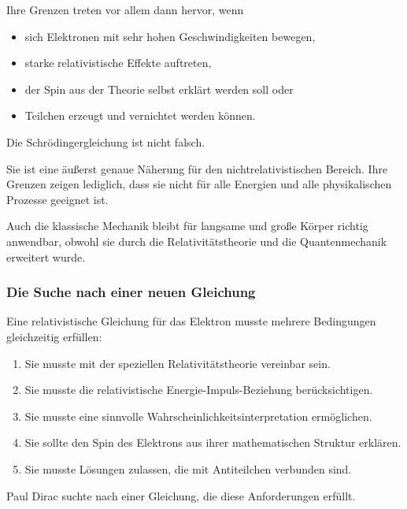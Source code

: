 Ihre Grenzen treten vor allem dann hervor, wenn

\begin{itemize}
	\item sich Elektronen mit sehr hohen Geschwindigkeiten bewegen,
	\item starke relativistische Effekte auftreten,
	\item der Spin aus der Theorie selbst erklärt werden soll oder
	\item Teilchen erzeugt und vernichtet werden können.
\end{itemize}

\begin{DidacticBox}
	\label{box:naeherung_keine_falsche_theorie}
	
	Die Schrödingergleichung ist nicht falsch.
	
	Sie ist eine äußerst genaue Näherung für den nichtrelativistischen
	Bereich. Ihre Grenzen zeigen lediglich, dass sie nicht für alle
	Energien und alle physikalischen Prozesse geeignet ist.
	
	Auch die klassische Mechanik bleibt für langsame und große Körper
	richtig anwendbar, obwohl sie durch die Relativitätstheorie und die
	Quantenmechanik erweitert wurde.
\end{DidacticBox}

\subsubsection*{Die Suche nach einer neuen Gleichung}

Eine relativistische Gleichung für das Elektron musste mehrere
Bedingungen gleichzeitig erfüllen:

\begin{enumerate}
	\item Sie musste mit der speziellen Relativitätstheorie vereinbar
	sein.
	\item Sie musste die relativistische Energie-Impuls-Beziehung
	berücksichtigen.
	\item Sie musste eine sinnvolle Wahrscheinlichkeitsinterpretation
	ermöglichen.
	\item Sie sollte den Spin des Elektrons aus ihrer mathematischen
	Struktur erklären.
	\item Sie musste Lösungen zulassen, die mit Antiteilchen verbunden
	sind.
\end{enumerate}

Paul Dirac suchte nach einer Gleichung, die diese
Anforderungen erfüllt.

